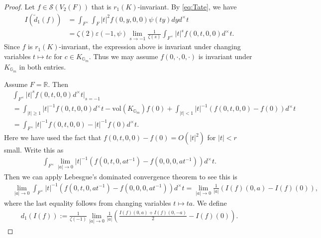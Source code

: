 \documentclass[11pt,a4paper,reqno]{amsart}
\theoremstyle{remark}
\numberwithin{equation}{section}
\newcommand{\RR}{\mathbb{R}}
\newcommand{\GG}{\mathbb{G}}
\theoremstyle{definition}
\numberwithin{equation}{section}
\begin{document}
\begin{proof}
Let $f\in \mathcal{S}(V_2(F))$ that is $r_1(K)$-invariant. By \eqref{eq:Tate}, we have
\begin{align*}
    I(\tilde{d}_1(f))&=\int_{F^\times}\int_F|t|^{2}f(0,y,0,0)\psi(ty)dy d^\times t\\
    &=\zeta(2)\varepsilon(-1,\psi)\lim_{s\to -1}\frac{1}{\zeta(s)}\int_{F^\times} |t|^{s}f(0,t,0,0) d^\times t.
\end{align*}
Since $f$ is $r_1(K)$-invariant, the expression above is invariant under changing variables $t\mapsto tc$ for $c\in K_{\GG_m}.$ Thus we may assume $f(0,\cdot,0,\cdot)$ is invariant under $K_{\GG_m}$ in both entries.

Assume $F=\RR$. Then
\begin{align*}
    &\int_{F^\times} |t|^{s}f(0,t,0,0) d^\times t\Bigg|_{s=-1}\\
    &=\int_{|t|\ge 1} |t|^{-1}f(0,t,0,0)d^\times t-\mathrm{vol}(K_{\GG_m})f(0)+\int_{|t|<1} |t|^{-1}(f(0,t,0,0)-f(0))d^\times t\\
    &= \int_{F^\times} |t|^{-1}f(0,t,0,0)-|t|^{-1}f(0) d^\times t.
\end{align*}
Here we have used the fact that $f(0,t,0,0)-f(0)=O(|t|^2)$ for $|t|<r$ small. Write this as
\begin{align*}
    \int_{F^\times} \lim_{|a|\to 0} |t|^{-1}\left(f(0,t,0,at^{-1})-f(0,0,0,at^{-1})\right) d^\times t.
\end{align*} Then we can apply Lebesgue's dominated convergence theorem to see this is
\begin{align*}
    &\lim_{|a|\to 0}\int_{F^\times} |t|^{-1}\left(f(0,t,0,at^{-1})-f(0,0,0,at^{-1})\right) d^\times t=\lim_{|a|\to 0}\frac{1}{|a|} \left(I(f)(0,a)-I(f)(0)\right),
\end{align*}
where the last equality follows from changing variables $t\mapsto ta.$ We define
\begin{align*}
    d_1(I(f)):=\frac{1}{\zeta(-1)}\lim_{|a|\to 0}\frac{1}{|a|} \left(\frac{I(f)(0,a)+I(f)(0,-a)}{2}-I(f)(0)\right).
\end{align*}






\end{proof}
\end{document}
